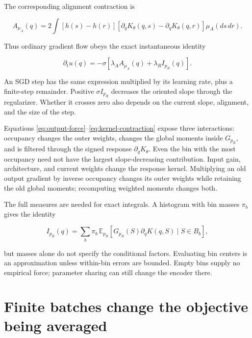 \documentclass[11pt]{article}
\begin{document}
The corresponding alignment contraction is

\begin{equation}\label{eq:alignment}
A_{\mu_A}(q)=2\int [h(s)-h(r)]
[\partial_qK_\theta(q,s)-\partial_qK_\theta(q,r)]\mu_A(ds\,dr).
\end{equation}

Thus ordinary gradient flow obeys the exact instantaneous identity

\begin{equation}\label{eq:gradient-flow}
\partial_tu(q)=-\sigma[\lambda_A A_{\mu_A}(q)+\lambda_R I_{p_R}(q)].
\end{equation}

An SGD step has the same expression multiplied by its learning rate,
plus a finite-step remainder. Positive \(\sigma I_{p_R}\) decreases the
oriented slope through the regularizer. Whether it crosses zero also
depends on the current slope, alignment, and the size of the step.

Equations \eqref{eq:output-force}--\eqref{eq:kernel-contraction} expose three interactions: occupancy changes the
outer weights, changes the global moments inside \(G_{p_R}\), and is
filtered through the signed response \(\partial_qK_\theta\). Even the
bin with the most occupancy need not have the largest slope-decreasing
contribution. Input gain, architecture, and current weights change the
response kernel. Multiplying an old output gradient by inverse occupancy
changes its outer weights while retaining the old global moments;
recomputing weighted moments changes both.

The full measures are needed for exact integrals. A histogram with bin
masses \(\pi_b\) gives the identity

\begin{equation}\label{eq:bins}
I_{p_R}(q)=\sum_b\pi_b\,\mathbb E_{p_R}[G_{p_R}(S)\partial_qK(q,S)\mid S\in B_b],
\end{equation}

but masses alone do not specify the conditional factors. Evaluating bin
centers is an approximation unless within-bin errors are bounded. Empty
bins supply no empirical force; parameter sharing can still change the
encoder there.

\section{Finite batches change the objective being
averaged}\label{finite-batches-change-the-objective-being-averaged}
\end{document}
